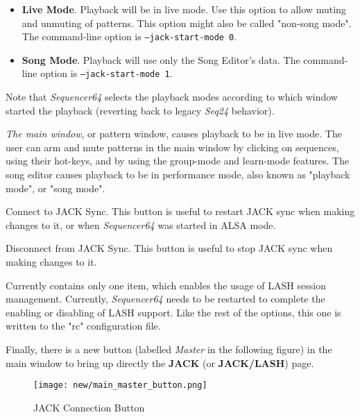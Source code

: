    \begin{itemize}
      \item \textbf{Live Mode}.
         Playback will be in live mode.  Use this option to allow muting and
         unmuting of patterns.  This option might also be called "non-song
         mode".
         The command-line option is \texttt{--jack-start-mode 0}.
      \item \textbf{Song Mode}.
         Playback will use only the Song Editor's data.
         The command-line option is \texttt{--jack-start-mode 1}.
   \end{itemize}

   Note that \textsl{Sequencer64} 
   selects the playback modes
   according to which window started the playback
   (reverting back to legacy \textsl{Seq24} behavior).

   \textsl{The main window}, or pattern
   window, causes playback to be in live mode.  The user can arm and mute
   patterns in the main window by clicking on sequences, using their hot-keys,
   and by using the group-mode and learn-mode features.
   The song editor causes playback to be in performance mode, also known as
   "playback mode", or "song mode".

   Connect to JACK Sync.
   This button is useful to restart JACK sync when making changes to it,
   or when \textsl{Sequencer64} was started in ALSA mode.

   Disconnect from JACK Sync.
   This button is useful to stop JACK sync when making changes to it.

   Currently contains only one item, which enables the usage of LASH session
   management.  Currently, \textsl{Sequencer64} needs to be restarted to
   complete the enabling or disabling of LASH support.  Like the rest of the
   options, this one is written to the "rc" configuration file.

   Finally, there is a new button (labelled \textsl{Master} in the following
   figure) in the main window to bring up directly the
   \textbf{JACK} (or \textbf{JACK/LASH}) page.

\begin{figure}[H]
   \centering 
   \texttt{[image: new/main\_master\_button.png]}
   \caption{JACK Connection Button}
   \label{fig:seq64_main_master_button}
\end{figure}

